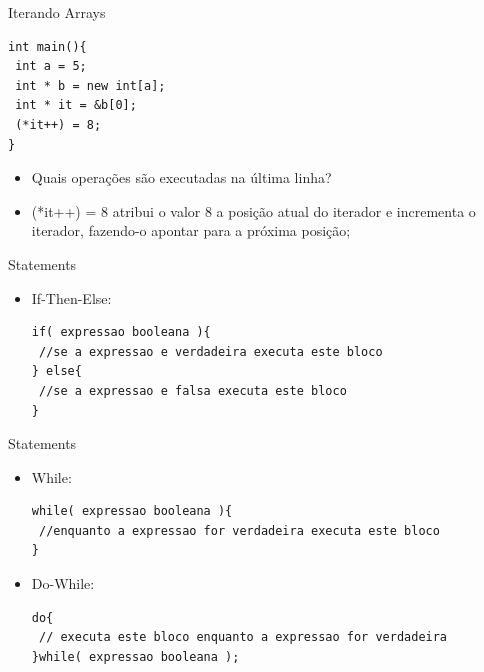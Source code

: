 \documentclass[12pt,table,xcolor={dvipsnames}]{beamer}
\begin{document}
\begin{frame}[fragile]{Iterando Arrays}
\begin{lstlisting}
int main(){
 int a = 5;
 int * b = new int[a];
 int * it = &b[0];
 (*it++) = 8;
}
\end{lstlisting}
\begin{itemize}
\item Quais operações são executadas na última linha?\pause
\item {\color{red}(*it++) = 8 atribui o valor 8 a posição atual do iterador e incrementa o iterador, fazendo-o apontar para a próxima posição;}
\end{itemize}
\end{frame}

\begin{frame}[fragile]{Statements}

\begin{itemize}
\item If-Then-Else:
\begin{lstlisting}
if( expressao booleana ){
 //se a expressao e verdadeira executa este bloco
} else{
 //se a expressao e falsa executa este bloco
}
\end{lstlisting}
\end{itemize}
\end{frame}

\begin{frame}[fragile]{Statements}

\begin{itemize}
\item While:
\begin{lstlisting}
while( expressao booleana ){
 //enquanto a expressao for verdadeira executa este bloco
}
\end{lstlisting}
\item Do-While:
\begin{lstlisting}
do{
 // executa este bloco enquanto a expressao for verdadeira
}while( expressao booleana );
\end{lstlisting}
\end{itemize}
\end{frame}
\end{document}
